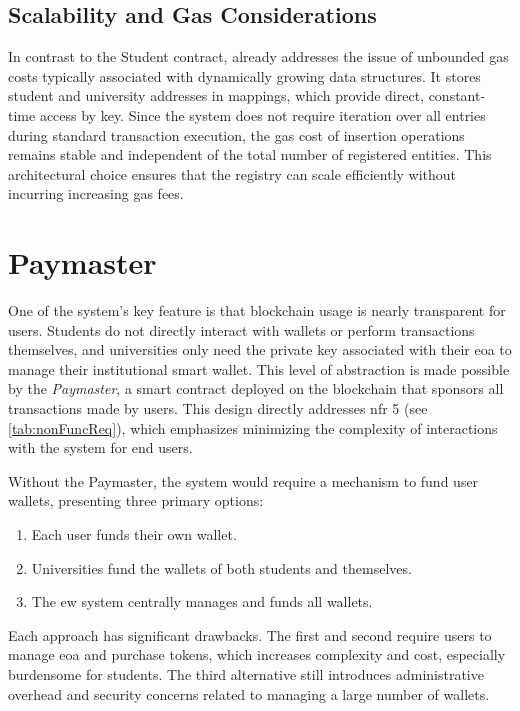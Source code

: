 \subsection{Scalability and Gas Considerations}
In contrast to the Student contract, already addresses the issue of unbounded gas costs typically associated with dynamically growing data structures. It stores student and university addresses in mappings, which provide direct, constant-time access by key. Since the system does not require iteration over all entries during standard transaction execution, the gas cost of insertion operations remains stable and independent of the total number of registered entities. This architectural choice ensures that the registry can scale efficiently without incurring increasing gas fees.

\section{Paymaster}
\label{sec:paymasterDesign}
One of the system's key feature is that blockchain usage is nearly transparent for users. Students do not directly interact with wallets or perform transactions themselves, and universities only need the private key associated with their \gls{eoa} to manage their institutional smart wallet. This level of abstraction is made possible by the \textit{Paymaster}, a smart contract deployed on the blockchain that sponsors all transactions made by users. This design directly addresses \gls{nfr} 5 (see \cref{tab:nonFuncReq}), which emphasizes minimizing the complexity of interactions with the system for end users.

Without the Paymaster, the system would require a mechanism to fund user wallets, presenting three primary options:
\begin{enumerate}
    \item Each user funds their own wallet.
    \item Universities fund the wallets of both students and themselves.
    \item The \gls{ew} system centrally manages and funds all wallets.
\end{enumerate}
Each approach has significant drawbacks. The first and second require users to manage \gls{eoa} and purchase tokens, which increases complexity and cost, especially burdensome for students. The third alternative still introduces administrative overhead and security concerns related to managing a large number of wallets.


